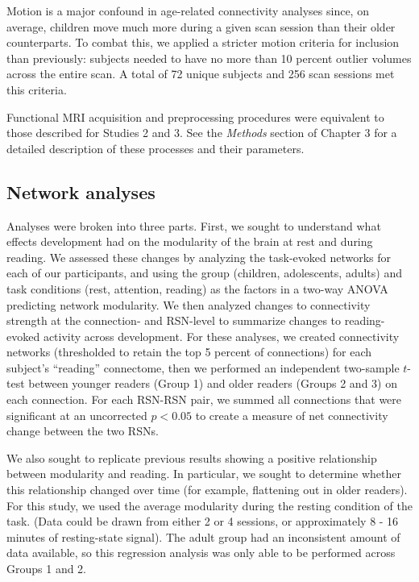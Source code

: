 Motion is a major confound in age-related connectivity analyses since, on average, children move much more during a given scan session than their older counterparts. To combat this, we applied a stricter motion criteria for inclusion than previously: subjects needed to have no more than 10 percent outlier volumes across the entire scan. A total of 72 unique subjects and 256 scan sessions met this criteria. 

Functional MRI acquisition and preprocessing procedures were equivalent to those described for Studies 2 and 3. See the \textit{Methods} section of Chapter 3 for a detailed description of these processes and their parameters.

\subsection{Network analyses}

Analyses were broken into three parts. First, we sought to understand what effects development had on the modularity of the brain at rest and during reading. We assessed these changes by analyzing the task-evoked networks for each of our participants, and using the group (children, adolescents, adults) and task conditions (rest, attention, reading) as the factors in a two-way ANOVA predicting network modularity. We then analyzed changes to connectivity strength at the connection- and RSN-level to summarize changes to reading-evoked activity across development. For these analyses, we created connectivity networks (thresholded to retain the top 5 percent of connections) for each subject's ``reading'' connectome, then we performed an independent two-sample $t$-test between younger readers (Group 1) and older readers (Groups 2 and 3) on each connection. For each RSN-RSN pair, we summed all connections that were significant at an uncorrected $p < 0.05$ to create a measure of net connectivity change between the two RSNs.

We also sought to replicate previous results showing a positive relationship between modularity and reading. In particular, we sought to determine whether this relationship changed over time (for example, flattening out in older readers). For this study, we used the average modularity during the resting condition of the task. (Data could be drawn from either 2 or 4 sessions, or approximately 8 - 16 minutes of resting-state signal). The adult group had an inconsistent amount of data available, so this regression analysis was only able to be performed across Groups 1 and 2.

